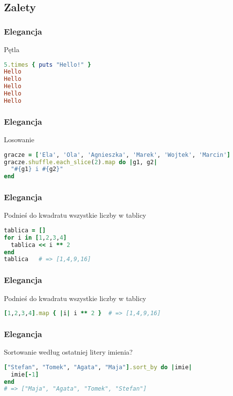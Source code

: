 \subsection{Zalety}

\begin{frame}[fragile]
\frametitle{Elegancja}
\begin{block}{Pętla}
\begin{lstlisting}[language=Ruby]
5.times { puts "Hello!" }
Hello
Hello
Hello
Hello
Hello
\end{lstlisting}
\end{block}
\end{frame}

\begin{frame}[fragile]
\frametitle{Elegancja}
\begin{block}{Losowanie}
\begin{lstlisting}[language=Ruby]
gracze = ['Ela', 'Ola', 'Agnieszka', 'Marek', 'Wojtek', 'Marcin']
gracze.shuffle.each_slice(2).map do |g1, g2|
  "#{g1} i #{g2}"
end
\end{lstlisting}
\end{block}
\end{frame}

\begin{frame}[fragile]
\frametitle{Elegancja}
\begin{block}{Podnieś do kwadratu wszystkie liczby w tablicy}
\begin{lstlisting}[language=Ruby]
tablica = []
for i in [1,2,3,4]
  tablica << i ** 2
end
tablica   # => [1,4,9,16]
\end{lstlisting}
\end{block}
\end{frame}

\begin{frame}[fragile]
\frametitle{Elegancja}
\begin{block}{Podnieś do kwadratu wszystkie liczby w tablicy}
\begin{lstlisting}[language=Ruby]
[1,2,3,4].map { |i| i ** 2 }  # => [1,4,9,16]
\end{lstlisting}
\end{block}
\end{frame}

\begin{frame}[fragile]
\frametitle{Elegancja}
\begin{block}{Sortowanie według ostatniej litery imienia?}
\begin{lstlisting}[language=Ruby]
["Stefan", "Tomek", "Agata", "Maja"].sort_by do |imie|
  imie[-1]
end
# => ["Maja", "Agata", "Tomek", "Stefan"]
\end{lstlisting}
\end{block}
\end{frame}

